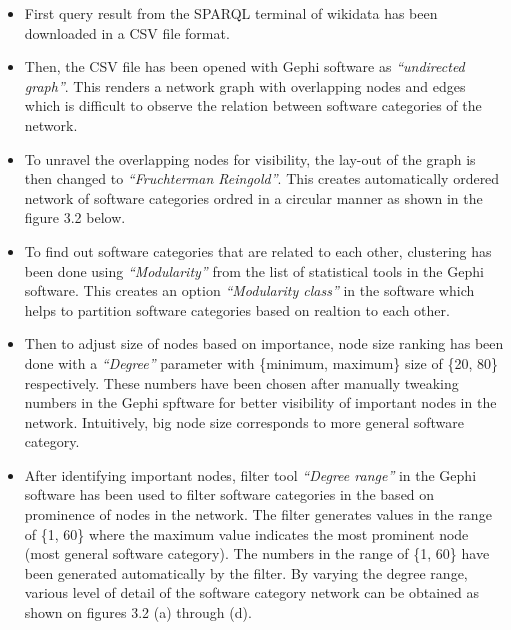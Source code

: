 \begin{itemize}
	\itemsep.85em
	\item First query result from the \ac{SPARQL} terminal of wikidata has been downloaded in a \ac{CSV} file format. 
	\item Then, the \ac{CSV} file has been opened with Gephi software as \emph{“undirected graph”}. This renders a network graph with overlapping nodes and edges which is difficult to observe the relation between software categories of the network. 
	\item To unravel the overlapping nodes for visibility, the lay-out of the graph is then changed to \emph{“Fruchterman Reingold”}. This creates automatically ordered network of software categories ordred in a circular manner as shown in the figure 3.2 below. 
	\item To find out software categories that are related to each other, clustering has been done using  \emph{“Modularity”} from the list of statistical tools in the Gephi software. This creates an option \emph{“Modularity class”} in the software which helps to partition software categories based on realtion to each other. 
	\item Then to adjust size of nodes based on importance, node size ranking has been done with a \emph{“Degree”} parameter with \{minimum, maximum\} size of  \{20, 80\} respectively. These numbers have been chosen after manually tweaking numbers in the Gephi spftware for better visibility of important nodes in the network. Intuitively, big node size corresponds to more general software category. 
	
	\item After identifying important nodes, filter tool \emph{“Degree range”} in the Gephi software has been used to filter software categories in the based on prominence of nodes in the network. The filter generates values in the range of \{1, 60\} where the maximum value indicates the most prominent node (most general software category). The numbers in the range of  \{1, 60\} have been generated automatically by the filter. By varying the degree range, various level of detail of the software category network can be obtained as shown on figures 3.2 (a) through (d).
\end{itemize}

